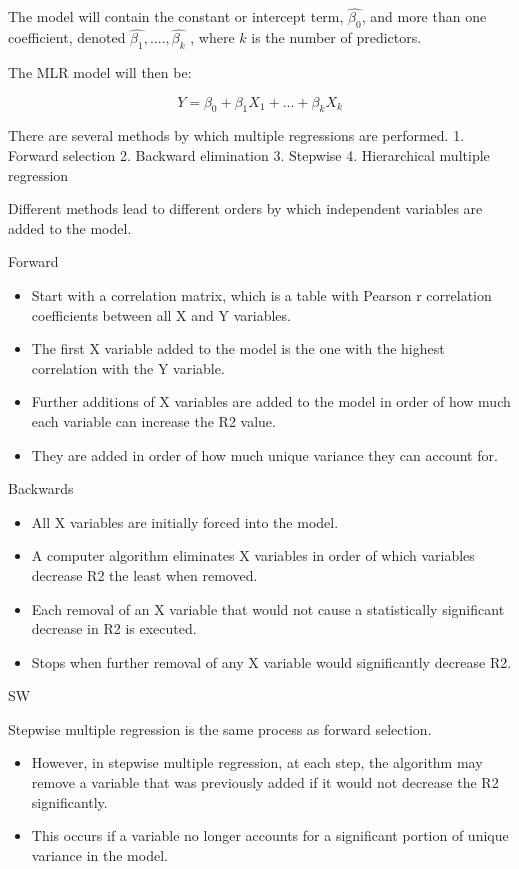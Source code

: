 \documentclass[
]{article}
\providecommand{\tightlist}{%
  \setlength{\itemsep}{0pt}\setlength{\parskip}{0pt}}
\begin{document}
The model will contain the constant or intercept term, \(\hat{\beta_0}\), and more than one coefficient, denoted \(\hat{\beta_1}, ....,\hat{\beta_k}\) , where \(k\) is the number of predictors.

The MLR model will then be:

\[
Y=\beta_0+\beta_1X_1+...+\beta_kX_k
\]

There are several methods by which multiple regressions are performed. 1. Forward selection 2. Backward elimination 3. Stepwise 4. Hierarchical multiple regression

Different methods lead to different orders by which independent variables are added to the model.

Forward

\begin{itemize}
\tightlist
\item
  Start with a correlation matrix, which is a table with Pearson r correlation coefficients between all X and Y variables.
\item
  The first X variable added to the model is the one with the highest correlation with the Y variable.
\item
  Further additions of X variables are added to the model in order of how much each variable can increase the R2 value.
\item
  They are added in order of how much unique variance they can account for.
\end{itemize}

Backwards

\begin{itemize}
\tightlist
\item
  All X variables are initially forced into the model.
\item
  A computer algorithm eliminates X variables in order of which variables decrease R2 the least when removed.
\item
  Each removal of an X variable that would not cause a statistically significant decrease in R2 is executed.
\item
  Stops when further removal of any X variable would significantly decrease R2.
\end{itemize}

SW

Stepwise multiple regression is the same process as forward selection.

\begin{itemize}
\item
  However, in stepwise multiple regression, at each step, the algorithm may remove a variable that was previously added if it would not decrease the R2 significantly.
\item
  This occurs if a variable no longer accounts for a significant portion of unique variance in the model.
\end{itemize}
\end{document}
